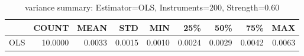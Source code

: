 \begin{table}[ht]
\centering
\caption{variance summary: Estimator=OLS, Instruments=200, Strength=0.60}
\begin{tabular}{lrrrrrrrr}
\toprule
 & COUNT & MEAN & STD & MIN & 25\% & 50\% & 75\% & MAX \\
\midrule
OLS & 10.0000 & 0.0033 & 0.0015 & 0.0010 & 0.0024 & 0.0029 & 0.0042 & 0.0063 \\
\bottomrule
\end{tabular}
\end{table}
